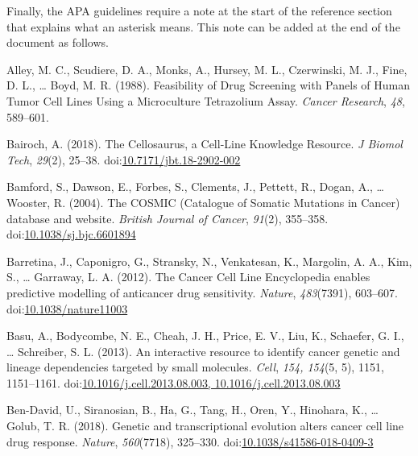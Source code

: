 \documentclass[man,floatsintext]{apa6}
\begin{document}
\begingroup
\setlength{\parindent}{-0.5in} \setlength{\leftskip}{0.5in}

Finally, the APA guidelines require a note at the start of the reference
section that explains what an asterisk means. This note can be added at
the end of the document as follows.

\hypertarget{refs}{}
\hypertarget{ref-alley1988}{}
Alley, M. C., Scudiere, D. A., Monks, A., Hursey, M. L., Czerwinski, M.
J., Fine, D. L., \ldots{} Boyd, M. R. (1988). Feasibility of Drug
Screening with Panels of Human Tumor Cell Lines Using a Microculture
Tetrazolium Assay. \emph{Cancer Research}, \emph{48}, 589--601.

\hypertarget{ref-bairoch2018}{}
Bairoch, A. (2018). The Cellosaurus, a Cell-Line Knowledge Resource.
\emph{J Biomol Tech}, \emph{29}(2), 25--38.
doi:\href{https://doi.org/10.7171/jbt.18-2902-002}{10.7171/jbt.18-2902-002}

\hypertarget{ref-bamford2004}{}
Bamford, S., Dawson, E., Forbes, S., Clements, J., Pettett, R., Dogan,
A., \ldots{} Wooster, R. (2004). The COSMIC (Catalogue of Somatic
Mutations in Cancer) database and website. \emph{British Journal of
Cancer}, \emph{91}(2), 355--358.
doi:\href{https://doi.org/10.1038/sj.bjc.6601894}{10.1038/sj.bjc.6601894}

\hypertarget{ref-barretina2012}{}
Barretina, J., Caponigro, G., Stransky, N., Venkatesan, K., Margolin, A.
A., Kim, S., \ldots{} Garraway, L. A. (2012). The Cancer Cell Line
Encyclopedia enables predictive modelling of anticancer drug
sensitivity. \emph{Nature}, \emph{483}(7391), 603--607.
doi:\href{https://doi.org/10.1038/nature11003}{10.1038/nature11003}

\hypertarget{ref-basu2013}{}
Basu, A., Bodycombe, N. E., Cheah, J. H., Price, E. V., Liu, K.,
Schaefer, G. I., \ldots{} Schreiber, S. L. (2013). An interactive
resource to identify cancer genetic and lineage dependencies targeted by
small molecules. \emph{Cell}, \emph{154, 154}(5, 5), 1151, 1151--1161.
doi:\href{https://doi.org/10.1016/j.cell.2013.08.003,\%2010.1016/j.cell.2013.08.003}{10.1016/j.cell.2013.08.003, 10.1016/j.cell.2013.08.003}

\hypertarget{ref-ben-david2018}{}
Ben-David, U., Siranosian, B., Ha, G., Tang, H., Oren, Y., Hinohara, K.,
\ldots{} Golub, T. R. (2018). Genetic and transcriptional evolution
alters cancer cell line drug response. \emph{Nature}, \emph{560}(7718),
325--330.
doi:\href{https://doi.org/10.1038/s41586-018-0409-3}{10.1038/s41586-018-0409-3}
\end{document}
